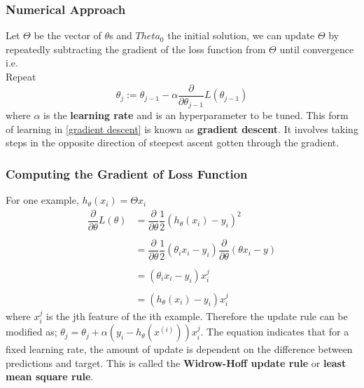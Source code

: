 \documentclass[12pt,a4paper,titlepage,landscape]{book}
\begin{document}
	\subsubsection{Numerical Approach}
	Let $\Theta$ be the vector of $\theta$s and $Theta_0$ the initial solution, we can update $\Theta$ by repeatedly subtracting the gradient of the loss function from $\Theta$ until convergence i.e. \\
	Repeat 
	\begin{equation}\label{gradient descent}
	\theta_j := \theta_{j-1} - \alpha\dfrac{\partial}{\partial\theta_{j-1}}L(\theta_{j-1})
	\end{equation} where $\alpha$ is the \textbf{learning rate} and is an hyperparameter to be tuned.
	This form of learning in \eqref{gradient descent} is known as \textbf{gradient descent}. It involves taking steps in the opposite direction of steepest ascent gotten through the gradient.
	
	\subsubsection{Computing the Gradient of Loss Function}
	For one example, $h_\theta(x_i) = \Theta{x_i}$
	\begin{equation*}
	\begin{array}{cl}
	\dfrac{\partial}{\partial\theta}L(\theta) &= \dfrac{\partial}{\partial\theta} \dfrac{1}{2}\left(h_\theta(x_i) - y_i\right)^2 \\
	\\
	&= \dfrac{\partial}{\partial\theta} \dfrac{1}{2}\left(\theta_i{x_i} - y_i\right)\dfrac{\partial}{\partial\theta}\left(\theta{x_i - y}\right) \\\\
	&= \left(\theta_i{x_i} - y_i\right)x_i^j \\\\
	&= \left(h_\theta(x_i) - y_i\right)x_i^j
	\end{array}
	\end{equation*} where $x_i^j$ is the jth feature of the ith example. Therefore the update rule can be modified as;
	$\theta_j = \theta_{j} + \alpha(y_i - h_\theta(x^{(i)}))x_i^j$.
	The equation indicates that for a fixed learning rate, the amount of update is dependent on the difference between predictions and target. This is called the \textbf{Widrow-Hoff update rule} or \textbf{least mean square rule}.
	
\end{document}
